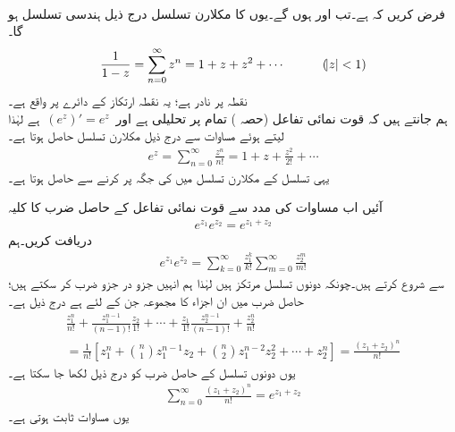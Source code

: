%
\quad {}\\
فرض کریں کہ  ہے۔تب  اور  ہوں گے۔یوں  کا مکلارن تسلسل درج ذیل ہندسی تسلسل ہو گا۔
\begin{align}\label{مساوات_ٹیلر_ہندسی_تسلسل_مثال}
\frac{1}{1-z}=\sum\limits_{n=0}^{\infty} z^n=1+z+z^2+\cdots \quad \quad \quad (\abs{z}<1)
\end{align}
 نقطہ  پر نادر ہے؛ یہ نقطہ ارتکاز کے دائرے پر واقع ہے۔
\quad {}\\
ہم جانتے ہیں کہ قوت نمائی تفاعل  (حصہ ) تمام  پر تحلیلی ہے اور 
$\,(e^z)'=e^z\,$
ہے لہٰذا  لیتے ہوئے مساوات  سے درج ذیل مکلارن تسلسل حاصل ہوتا ہے۔
\begin{align}\label{مساوات_ٹیلر_قوت_نمائی_مکلارن_تسلسل}
e^z=\sum\limits_{n=0}^{\infty} \frac{z^n}{n!}=1+z+\frac{z^2}{2!}+\cdots
\end{align}
یہی تسلسل  کے مکلارن تسلسل میں  کی جگہ  پر کرنے سے حاصل ہوتا ہے۔

آئیں اب مساوات  کی مدد سے قوت نمائی تفاعل کے حاصل ضرب کا کلیہ
\begin{align}\label{مساوات_ٹیلر_قوت_نمائی_حاصل_ضرب}
e^{z_1}e^{z_2}=e^{z_1+z_2}
\end{align}
دریافت کریں۔ہم
\begin{align*}
e^{z_1}e^{z_2}=\sum\limits_{k=0}^{\infty} \frac{z_1^k}{k!}\sum\limits_{m=0}^{\infty}\frac{z_2^m}{m!}
\end{align*}
سے شروع کرتے ہیں۔چونکہ دونوں تسلسل مرتکز ہیں لہٰذا ہم انہیں جزو در جزو ضرب کر سکتے ہیں؛حاصل ضرب میں ان  اجزاء کا مجموعہ جن کے لئے  ہے درج ذیل ہے۔
\begin{multline*}
\frac{z_1^n}{n!}+\frac{z_1^{n-1}}{(n-1)!}\frac{z_2}{1!}+\cdots+\frac{z_1}{1!}\frac{z_2^{n-1}}{(n-1)!}+\frac{z_2^n}{n!}\\
=\frac{1}{n!}[z_1^n+\binom{n}{1}z_1^{n-1}z_2+\binom{n}{2}z_1^{n-2}z_2^2+\cdots+z_2^n]=\frac{(z_1+z_2)^n}{n!}
\end{multline*}
یوں دونوں تسلسل کے حاصل ضرب کو درج ذیل لکھا جا سکتا ہے۔
\begin{align*}
\sum\limits_{n=0}^{\infty}\frac{(z_1+z_2)^n}{n!}=e^{z_1+z_2}
\end{align*}
یوں مساوات  ثابت ہوتی ہے۔


